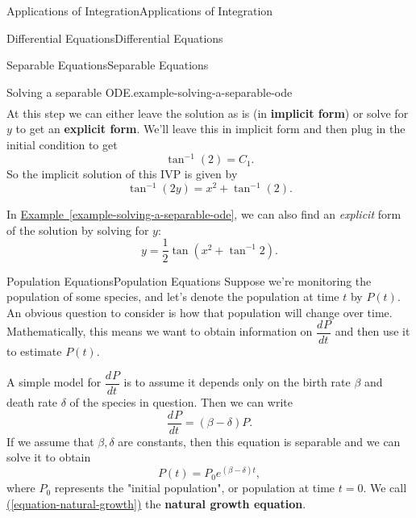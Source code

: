 \documentclass[10pt,]{book}
\newcommand{\terminology}[1]{\textbf{#1}}
\numberwithin{equation}{section}
\newcommand{\dv}[3][]{\dfrac{d^{#1} #2}{d #3^{#1}}}
\begin{document}
\begin{chapterptx}{Applications of Integration}{}{Applications of Integration}{}{}
\begin{sectionptx}{Differential Equations}{}{Differential Equations}{}{}
\begin{subsectionptx}{Separable Equations}{}{Separable Equations}{}{}
\begin{example}{Solving a separable ODE.}{example-solving-a-separable-ode}
\begin{align*}
\end{align*}
\hypertarget{p-734}{}%
At this step we can either leave the solution as is (in \terminology{implicit form}) or solve for \(y\) to get an \terminology{explicit form}. We'll leave this in implicit form and then plug in the initial condition to get%
\begin{equation*}
\tan^{-1}(2) = C_{1}.
\end{equation*}
So the implicit solution of this IVP is given by%
\begin{equation*}
\tan^{-1}(2y) = x^{2}+\tan^{-1}(2).
\end{equation*}
%
\end{example}
\hypertarget{p-735}{}%
In \hyperref[example-solving-a-separable-ode]{Example~\ref{example-solving-a-separable-ode}}, we can also find an \emph{explicit} form of the solution by solving for \(y\):%
\begin{equation*}
y = \frac{1}{2}\tan(x^{2} + \tan^{-1}2).
\end{equation*}
%
\end{subsectionptx}
%
%
\typeout{************************************************}
\typeout{************************************************}
%
\begin{subsectionptx}{Population Equations}{}{Population Equations}{}{}\label{subsection-population-equations}
\hypertarget{p-736}{}%
Suppose we're monitoring the population of some species, and let's denote the population at time \(t\) by \(P(t)\). An obvious question to consider is how that population will change over time. Mathematically, this means we want to obtain information on \(\dv{P}{t}\) and then use it to estimate \(P(t)\).%
\par
\hypertarget{p-737}{}%
A simple model for \(\dv{P}{t}\) is to assume it depends only on the birth rate \(\beta\) and death rate \(\delta\) of the species in question. Then we can write%
\begin{equation}
\dv{P}{t} = (\beta - \delta)P.\label{equation-natural-growth}
\end{equation}
If we assume that \(\beta,\delta\) are constants, then this equation is separable and we can solve it to obtain%
\begin{equation*}
P(t) = P_{0}e^{(\beta - \delta)t},
\end{equation*}
where \(P_{0}\) represents the "initial population", or population at time \(t = 0\). We call \hyperref[equation-natural-growth]{(\ref{equation-natural-growth})} the \terminology{natural growth equation}.%

\end{subsectionptx}
\end{sectionptx}
\end{chapterptx}
\end{document}
